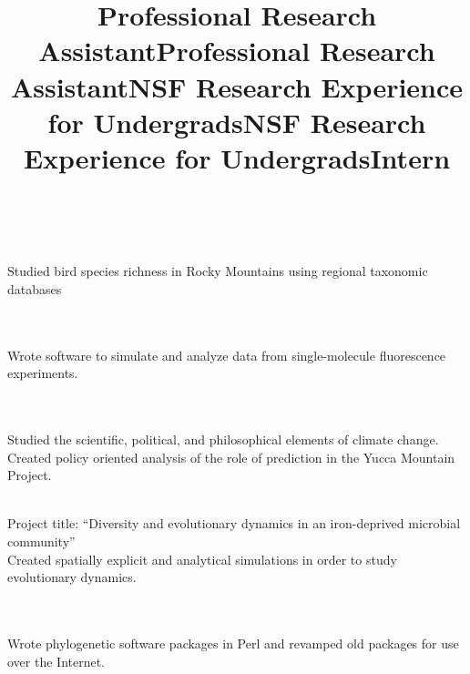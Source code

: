 \documentclass[overlapped,line,letterpaper]{res}
\begin{document}
\begin{resume}
\title{Professional Research Assistant}
\begin{position} \\[-4mm] 
\\ Studied bird species richness in Rocky Mountains using regional taxonomic databases
\end{position}

\title{Professional Research Assistant}
\begin{position} \\[-4mm] 
\\ Wrote software to simulate and analyze data from single-molecule fluorescence experiments.
\end{position} 

\title{NSF Research Experience for Undergrads}
\begin{position} \\[-4mm] 
\\ Studied the scientific, political, and philosophical elements of climate change.\\
Created policy oriented analysis of the role of prediction in the Yucca Mountain Project. 
\end{position}

\title{NSF Research Experience for Undergrads}
\begin{position} \\[-4mm] 
Project title: “Diversity and evolutionary dynamics in an iron-deprived microbial community” \\
Created spatially explicit and analytical simulations in order to study evolutionary dynamics. 
\end{position}

\title{Intern}
\begin{position} \\[-4mm] 
\\ Wrote phylogenetic software packages in Perl and revamped old packages for use over the Internet.
\end{position}


\end{resume}
\end{document}
